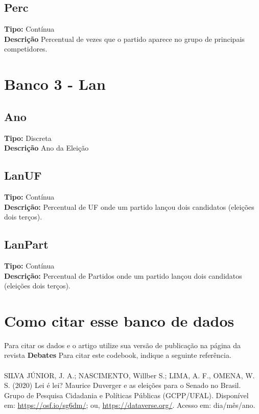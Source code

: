 \documentclass{article}\usepackage[]{graphicx}\usepackage[]{color}
\begin{document}
		\subsection{Perc}
		{\bf Tipo:} Contínua \\
		{\bf Descrição} Percentual de vezes que o partido aparece no grupo de principais competidores.\\




		\section{Banco 3 - Lan}
		\subsection{Ano}
		{\bf Tipo:} Discreta \\
		{\bf Descrição} Ano da Eleição \\

		\subsection{LanUF}
		{\bf Tipo:} Contínua \\
		{\bf Descrição:} Percentual de UF onde um partido lançou dois candidatos (eleições dois terços).

		\subsection{LanPart}
		{\bf Tipo:} Contínua \\
		{\bf Descrição:} Percentual de Partidos onde um partido lançou dois candidatos (eleições dois terços).\\




	\section{Como citar esse banco de dados}
	Para citar os dados e o artigo utilize sua versão de publicação na página da revista  \textbf{Debates}
	Para citar este codebook, indique a seguinte referência.
	\\ \\
	SILVA JÚNIOR, J. A.; NASCIMENTO, Willber S.; LIMA, A. F., OMENA, W. S. (2020)
	Lei é lei? Maurice Duverger e as eleições para o Senado no Brasil. Grupo de Pesquisa Cidadania e Políticas Públicas (GCPP/UFAL). Disponível em: \url{https://osf.io/sg6dm/}; ou, \url{https://dataverse.org/}. Acesso em: dia/mês/ano.
\end{document}

